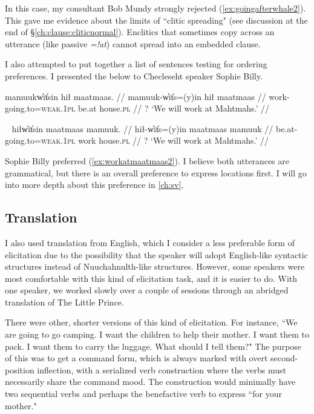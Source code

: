 \noindent In this case, my consultant Bob Mundy strongly rejected (\ref{ex:goingafterwhale2}). This gave me evidence about the limits of ``clitic spreading" (see discussion at the end of \S\ref{ch:clause:cliticnormal}). Enclitics that sometimes copy across an utterance (like passive \textit{=!at}) cannot spread into an embedded clause.

I also attempted to put together a list of sentences testing for ordering preferences. I presented the below to Checleseht speaker Sophie Billy.

\ex \label{ex:workatmaatmaas1}
\begingl
\glpreamble mamuukw̓it̓sin hił maatmaas. //
\gla mamuuk-w̓it̓s=(y)in hił maatmaas //
\glb work-going.to=\textsc{weak.1pl} be.at house.\textsc{pl} //
\glft ? `We will work at Mahtmahs.' //
\endgl
\xe

\ex~ \label{ex:workatmaatmaas2}
\begingl
\glpreamble hiłw̓it̓sin maatmaas mamuuk. //
\gla hił-w̓it̓s=(y)in maatmaas mamuuk //
\glb be.at-going.to=\textsc{weak.1pl} work house.\textsc{pl} //
\glft ? `We will work at Mahtmahs.' //
\endgl
\xe

\noindent Sophie Billy preferred (\ref{ex:workatmaatmaas2}). I believe both utterances are grammatical, but there is an overall preference to express locations first. I will go into more depth about this preference in \cref{ch:sv}.

\subsection{Translation}

I also used translation from English, which I consider a less preferable form of elicitation due to the possibility that the speaker will adopt English-like syntactic structures instead of Nuuchahnulth-like structures. However, some speakers were most comfortable with this kind of elicitation task, and it is easier to do. With one speaker, we worked slowly over a couple of sessions through an abridged translation of The Little Prince.

There were other, shorter versions of this kind of elicitation. For instance, ``We are going to go camping. I want the children to help their mother. I want them to pack. I want them to carry the luggage. What should I tell them?" The purpose of this was to get a command form, which is always marked with overt second-position inflection, with a serialized verb construction where the verbs must necessarily share the command mood. The construction would minimally have two sequential verbs and perhaps the benefactive verb to express ``for your mother."

